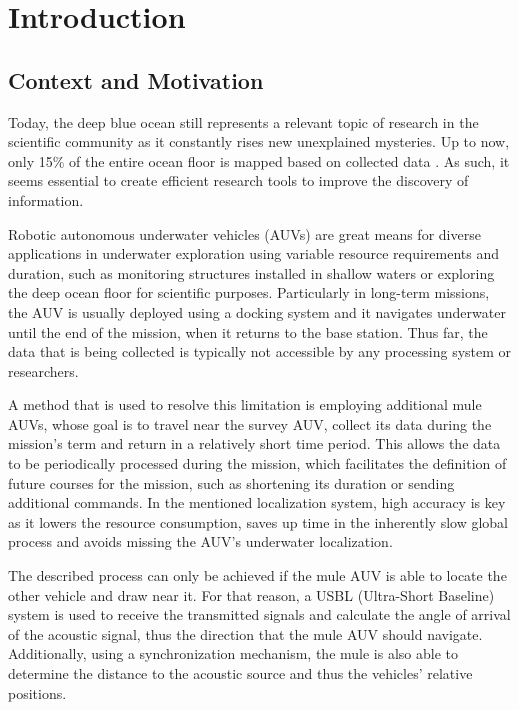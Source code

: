\chapter{Introduction} \label{chap:intro}

\section{Context and Motivation} \label{sec:context}

Today, the deep blue ocean still represents a relevant topic of research in the scientific community as it constantly rises new unexplained mysteries. Up to now, only 15\% of the entire ocean floor is mapped based on collected data \cite{deeperblue}. As such, it seems essential to create efficient research tools to improve the discovery of information.


Robotic autonomous underwater vehicles (AUVs) are great means for diverse applications in underwater exploration using variable resource requirements and duration, such as monitoring structures installed in shallow waters or exploring the deep ocean floor for scientific purposes. Particularly in long-term missions, the AUV is usually deployed using a docking system and it navigates underwater until the end of the mission, when it returns to the base station. Thus far, the data that is being collected is typically not accessible by any processing system or researchers. 

A method that is used to resolve this limitation is employing additional mule AUVs, whose goal is to travel near the survey AUV, collect its data during the mission's term and return in a relatively short time period. This allows the data to be periodically processed during the mission, which facilitates the definition of future courses for the mission, such as shortening its duration or sending additional commands. In the mentioned localization system, high accuracy is key as it lowers the resource consumption, saves up time in the inherently slow global process and avoids missing the AUV's underwater localization.

The described process can only be achieved if the mule AUV is able to locate the other vehicle and draw near it. For that reason, a USBL (Ultra-Short Baseline) system is used to receive the transmitted signals and calculate the angle of arrival of the acoustic signal, thus the direction that the mule AUV should navigate. Additionally, using a synchronization mechanism, the mule is also able to determine the distance to the acoustic source and thus the vehicles' relative positions.

